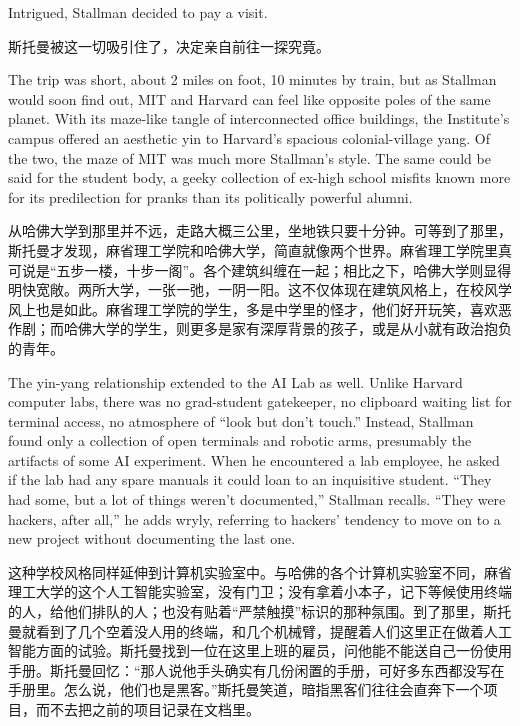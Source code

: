 \ifdefined\eng
Intrigued, Stallman decided to pay a visit.
\fi

\ifdefined\chs
斯托曼被这一切吸引住了，决定亲自前往一探究竟。
\fi

\ifdefined\eng
The trip was short, about 2 miles on foot, 10 minutes by train, but as Stallman would soon find out, MIT and Harvard can feel like opposite poles of the same planet. With its maze-like tangle of interconnected office buildings, the Institute's campus offered an aesthetic yin to Harvard's spacious colonial-village yang.  Of the two, the maze of MIT was much more Stallman's style. The same could be said for the student body, a geeky collection of ex-high school misfits known more for its predilection for pranks than its politically powerful alumni.
\fi

\ifdefined\chs
从哈佛大学到那里并不远，走路大概三公里，坐地铁只要十分钟。可等到了那里，斯托曼才发现，麻省理工学院和哈佛大学，简直就像两个世界。麻省理工学院里真可说是``五步一楼，十步一阁''。各个建筑纠缠在一起；相比之下，哈佛大学则显得明快宽敞。两所大学，一张一弛，一阴一阳。这不仅体现在建筑风格上，在校风学风上也是如此。麻省理工学院的学生，多是中学里的怪才，他们好开玩笑，喜欢恶作剧；而哈佛大学的学生，则更多是家有深厚背景的孩子，或是从小就有政治抱负的青年。
\fi

\ifdefined\eng
The yin-yang relationship extended to the AI Lab as well. Unlike Harvard computer labs, there was no grad-student gatekeeper, no clipboard waiting list for terminal access, no atmosphere of ``look but don't touch.'' Instead, Stallman found only a collection of open terminals and robotic arms, presumably the artifacts of some AI experiment. When he encountered a lab employee, he asked if the lab had any spare manuals it could loan to an inquisitive student. ``They had some, but a lot of things weren't documented,'' Stallman recalls. ``They were hackers, after all,'' he adds wryly, referring to hackers' tendency to move on to a new project without documenting the last one.
\fi

\ifdefined\chs
这种学校风格同样延伸到计算机实验室中。与哈佛的各个计算机实验室不同，麻省理工大学的这个人工智能实验室，没有门卫；没有拿着小本子，记下等候使用终端的人，给他们排队的人；也没有贴着``严禁触摸''标识的那种氛围。到了那里，斯托曼就看到了几个空着没人用的终端，和几个机械臂，提醒着人们这里正在做着人工智能方面的试验。斯托曼找到一位在这里上班的雇员，问他能不能送自己一份使用手册。斯托曼回忆：``那人说他手头确实有几份闲置的手册，可好多东西都没写在手册里。怎么说，他们也是黑客。''斯托曼笑道，暗指黑客们往往会直奔下一个项目，而不去把之前的项目记录在文档里。
\fi

